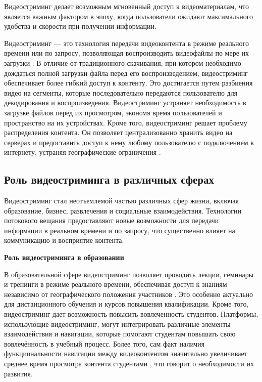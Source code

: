 	Видеостриминг делает возможным мгновенный доступ к видеоматериалам, что является важным фактором в эпоху, когда пользователи ожидают максимального удобства и скорости при получении информации.

	Видеостриминг — это технология передачи видеоконтента в режиме реального времени или по запросу, позволяющая воспроизводить видеофайлы по мере их загрузки . В отличие от традиционного скачивания, при котором необходимо дождаться полной загрузки файла перед его воспроизведением, видеостриминг обеспечивает более гибкий доступ к контенту. Это достигается путем разбиения видео на сегменты, которые последовательно передаются пользователю для декодирования и воспроизведения. Видеостриминг устраняет необходимость в загрузке файлов перед их просмотром, экономя время пользователей и пространство на их устройствах. Кроме того, видеостриминг решает проблему распределения контента. Он позволяет централизованно хранить видео на серверах и предоставить доступ к нему любому пользователю с подключением к интернету, устраняя географические ограничения \cite{apostolopoulosVideoStreaming}.
	
\subsection{Роль видеостриминга в различных сферах}

	Видеостриминг стал неотъемлемой частью различных сфер жизни, включая образование, бизнес, развлечения и социальные взаимодействия. Технологии потокового вещания предоставляют новые возможности для передачи информации в реальном времени и по запросу, что существенно влияет на коммуникацию и восприятие контента.

\textbf{Роль видеостриминга в образовании}

	В образовательной сфере видеостриминг позволяет проводить лекции, семинары и тренинги в режиме реального времени, обеспечивая доступ к знаниям независимо от географического положения участников \cite{brameEducationalVideos}. Это особенно актуально для дистанционного обучения и курсов повышения квалификации. Кроме того, видеостриминг дает возможность повысить вовлеченность студентов. Платформы, использующие видеостриминг, могут интегрировать различные элементы взаимодействия и навигации, которые помогают студентам повышать свою вовлечённость в учебный процесс. Более того, сам факт наличия функциональности навигации между видеоконтентом значительно увеличивает среднее время просмотра контента студентами \cite{brameEducationalVideos}, что говорит о необходимости их развития.

